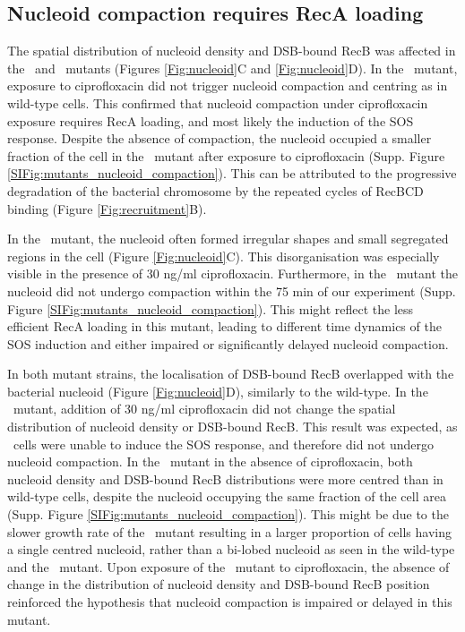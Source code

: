 \subsection*{Nucleoid compaction requires RecA loading}
The spatial distribution of nucleoid density and DSB-bound RecB was affected in the \dreca\ and \geneteneighty\ mutants (Figures \ref{Fig:nucleoid}C and \ref{Fig:nucleoid}D). In the \dreca\ mutant, exposure to ciprofloxacin did not trigger nucleoid compaction and centring as in wild-type cells. This confirmed that nucleoid compaction under ciprofloxacin exposure requires RecA loading, and most likely the induction of the SOS response. Despite the absence of compaction, the nucleoid occupied a smaller fraction of the cell in the \dreca\ mutant after exposure to ciprofloxacin (Supp. Figure \ref{SIFig:mutants_nucleoid_compaction}). This can be attributed to the progressive degradation of the bacterial chromosome by the repeated cycles of RecBCD binding (Figure \ref{Fig:recruitment}B).

In the \geneteneighty\ mutant, the nucleoid often formed irregular shapes and small segregated regions in the cell (Figure \ref{Fig:nucleoid}C). This disorganisation was especially visible in the presence of 30 ng/ml ciprofloxacin. Furthermore, in the \geneteneighty\ mutant the nucleoid did not undergo compaction within the 75 min of our experiment (Supp. Figure \ref{SIFig:mutants_nucleoid_compaction}). This might reflect the less efficient RecA loading in this mutant, leading to different time dynamics of the SOS induction and either impaired or significantly delayed nucleoid compaction.

In both mutant strains, the localisation of DSB-bound RecB overlapped with the bacterial nucleoid (Figure \ref{Fig:nucleoid}D), similarly to the wild-type. In the \dreca\ mutant, addition of 30 ng/ml ciprofloxacin did not change the spatial distribution of nucleoid density or DSB-bound RecB. This result was expected, as \dreca\ cells were unable to induce the SOS response, and therefore did not undergo nucleoid compaction. In the \geneteneighty\ mutant in the absence of ciprofloxacin, both nucleoid density and DSB-bound RecB distributions were more centred than in wild-type cells, despite the nucleoid occupying the same fraction of the cell area (Supp. Figure \ref{SIFig:mutants_nucleoid_compaction}). This might be due to the slower growth rate of the \teneighty\ mutant resulting in a larger proportion of cells having a single centred nucleoid, rather than a bi-lobed nucleoid as seen in the wild-type and the \dreca\ mutant. Upon exposure of the \geneteneighty\ mutant to ciprofloxacin, the absence of change in the distribution of nucleoid density and DSB-bound RecB position reinforced the hypothesis that nucleoid compaction is impaired or delayed in this mutant.

